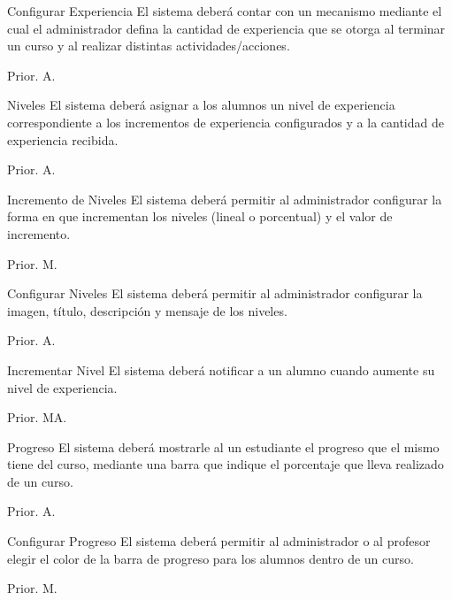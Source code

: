 \begin{RF}{Configurar Experiencia}{%
    El sistema deberá contar con un mecanismo mediante el cual el administrador defina la cantidad de experiencia que se otorga al terminar un curso y al realizar distintas actividades/acciones.}
    \item[] Prior. A. %
\end{RF}

\begin{RF}{Niveles}{%
    El sistema deberá asignar a los alumnos un nivel de experiencia correspondiente a los incrementos de experiencia configurados y a la cantidad de experiencia recibida. }
    \item[] Prior. A. %
\end{RF}

\begin{RF}{Incremento de Niveles}{%
    El sistema deberá permitir al administrador configurar la forma en que incrementan los niveles (lineal o porcentual) y el valor de incremento. }
    \item[] Prior. M. %
\end{RF}

\begin{RF}{Configurar Niveles}{%
    El sistema deberá permitir al administrador configurar la imagen, título, descripción y mensaje de los niveles. }
    \item[] Prior. A. %
\end{RF}

\begin{RF}{Incrementar Nivel}{%
    El sistema deberá notificar a un alumno cuando aumente su nivel de experiencia.}
    \item[] Prior. MA. %
\end{RF}

\begin{RF}{Progreso}{%
    El sistema deberá mostrarle al un estudiante el progreso que el mismo tiene del curso, mediante una barra que indique el porcentaje que lleva realizado de un curso.}
    \item[] Prior. A. %
\end{RF}

\begin{RF}{Configurar Progreso}{%
    El sistema deberá permitir al administrador o al profesor elegir el color de la barra de progreso para los alumnos dentro de un curso.}
    \item[] Prior. M. %
\end{RF}

